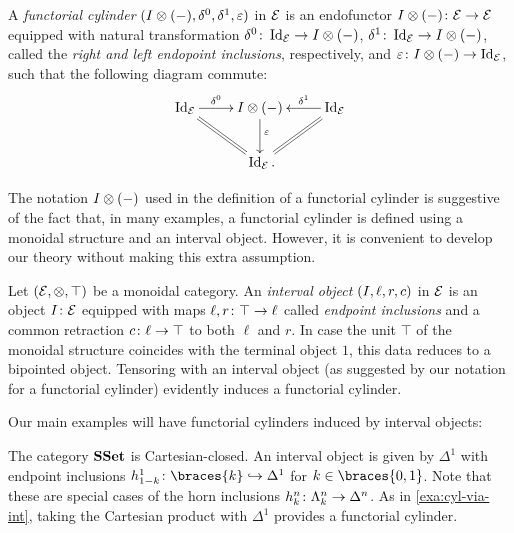 \documentclass[reqno,10pt,a4paper,oneside,draft]{amsart}
\begin{document}
\begin{definition}
A \emph{functorial cylinder} $(I \otimes (-), \delta^0, \delta^1, \varepsilon)$ in $\mathcal{E}$ is an endofunctor $I \otimes (-) \colon \mathcal{E} \to \mathcal{E}$ equipped with natural transformation $\delta^0 \colon \operatorname{Id}_{\mathcal{E}} \to I \otimes (-)$, $\delta^1 \colon \operatorname{Id}_{\mathcal{E}} \to I \otimes (-)$, called the \emph{right and left endopoint inclusions}, respectively, and $\varepsilon \colon I \otimes (-) \to \operatorname{Id}_{\mathcal{E}}$, such that the following diagram commute:
\[
\xymatrix{
  \Id_\catE \ar[r]^-{\lcyl} \ar@{=}[dr] & \interval \otimes (-) \ar[d]^-(.4){\ccyl} & \Id_\catE \ar@{=}[dl] \ar[l]_-{\rcyl} \\
  & \Id_\catE \rlap{.}
}
\]
\end{definition}

\medskip

The notation $I \otimes (-)$ used in the definition of a functorial cylinder is suggestive of the fact that, in many examples, a functorial cylinder is defined using a monoidal structure and an interval object.
However, it is convenient to develop our theory without making this extra assumption.

\begin{example} \label{exa:cyl-via-int}
Let $(\mathcal{E}, \otimes, \top)$ be a monoidal category.
An \emph{interval object} $(I, \ell, r, c)$ in $\mathcal{E}$ is an object $I \colon \mathcal{E}$ equipped with maps $\ell, r \colon \top \to \ell$ called \emph{endpoint inclusions} and a common retraction $c \colon \ell \to \top$ to both $\ell$ and $r$.
In case the unit $\top$ of the monoidal structure coincides with the terminal object $1$, this data reduces to a bipointed object.
Tensoring with an interval object (as suggested by our notation for a functorial cylinder) evidently induces a functorial cylinder.
\end{example}

\medskip

Our main examples will have functorial cylinders induced by interval objects:

\begin{example} \label{exa:cyl-in-sset}
The category $\mathbf{SSet}$ is Cartesian-closed.
An interval object is given by $\Delta^1$ with endpoint inclusions $h_{1-k}^1 \co \braces{k} \hookrightarrow \Delta^1$ for $k \in \braces{ 0, 1 }$.
Note that these are special cases of the horn inclusions $h_k^n \colon \Lambda_k^n \to \Delta^n$.
As in \cref{exa:cyl-via-int}, taking the Cartesian product with $\Delta^1$ provides a functorial cylinder.
\end{example}
\end{document}
